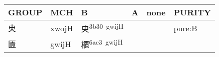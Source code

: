 \documentclass[14pt,a4paper]{scrartcl}
\begin{document}
\begin{longtable}[c]{@{}llllll@{}}
\toprule
\begin{minipage}[b]{0.14\columnwidth}\raggedright\strut
GROUP
\strut\end{minipage} &
\begin{minipage}[b]{0.14\columnwidth}\raggedright\strut
MCH
\strut\end{minipage} &
\begin{minipage}[b]{0.14\columnwidth}\raggedright\strut
B
\strut\end{minipage} &
\begin{minipage}[b]{0.14\columnwidth}\raggedright\strut
A
\strut\end{minipage} &
\begin{minipage}[b]{0.14\columnwidth}\raggedright\strut
none
\strut\end{minipage} &
\begin{minipage}[b]{0.14\columnwidth}\raggedright\strut
PURITY
\strut\end{minipage}\tabularnewline
\midrule
\endhead
\begin{minipage}[t]{0.14\columnwidth}\raggedright\strut
㬰
\strut\end{minipage} &
\begin{minipage}[t]{0.14\columnwidth}\raggedright\strut
xwojH
\strut\end{minipage} &
\begin{minipage}[t]{0.14\columnwidth}\raggedright\strut
㬰\textsuperscript{3b30~gwijH}
\strut\end{minipage} &
\begin{minipage}[t]{0.14\columnwidth}\raggedright\strut
\strut\end{minipage} &
\begin{minipage}[t]{0.14\columnwidth}\raggedright\strut
\strut\end{minipage} &
\begin{minipage}[t]{0.14\columnwidth}\raggedright\strut
pure:B
\strut\end{minipage}\tabularnewline
\begin{minipage}[t]{0.14\columnwidth}\raggedright\strut
匱
\strut\end{minipage} &
\begin{minipage}[t]{0.14\columnwidth}\raggedright\strut
gwijH
\strut\end{minipage} &
\begin{minipage}[t]{0.14\columnwidth}\raggedright\strut
櫃\textsuperscript{6ac3~gwijH}
\strut\end{minipage} &

\end{longtable}
\end{document}
